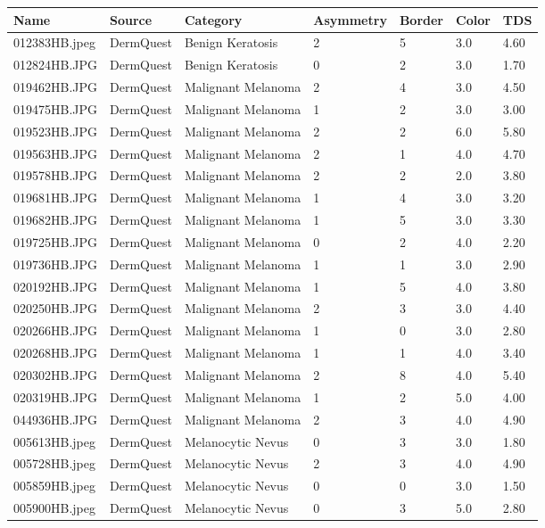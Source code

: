 \begin{longtable}{ | l | l | l | l | l | l | l |}
\hline
Name & Source & Category & Asymmetry & Border & Color & TDS \\ \hline
012383HB.jpeg & DermQuest & Benign Keratosis & 2 & 5 & 3.0 & 4.60 \\
012824HB.JPG & DermQuest & Benign Keratosis & 0 & 2 & 3.0 & 1.70 \\
019462HB.JPG & DermQuest & Malignant Melanoma & 2 & 4 & 3.0 & 4.50 \\
019475HB.JPG & DermQuest & Malignant Melanoma & 1 & 2 & 3.0 & 3.00 \\
019523HB.JPG & DermQuest & Malignant Melanoma & 2 & 2 & 6.0 & 5.80 \\
019563HB.JPG & DermQuest & Malignant Melanoma & 2 & 1 & 4.0 & 4.70 \\
019578HB.JPG & DermQuest & Malignant Melanoma & 2 & 2 & 2.0 & 3.80 \\
019681HB.JPG & DermQuest & Malignant Melanoma & 1 & 4 & 3.0 & 3.20 \\
019682HB.JPG & DermQuest & Malignant Melanoma & 1 & 5 & 3.0 & 3.30 \\
019725HB.JPG & DermQuest & Malignant Melanoma & 0 & 2 & 4.0 & 2.20 \\
019736HB.JPG & DermQuest & Malignant Melanoma & 1 & 1 & 3.0 & 2.90 \\
020192HB.JPG & DermQuest & Malignant Melanoma & 1 & 5 & 4.0 & 3.80 \\
020250HB.JPG & DermQuest & Malignant Melanoma & 2 & 3 & 3.0 & 4.40 \\
020266HB.JPG & DermQuest & Malignant Melanoma & 1 & 0 & 3.0 & 2.80 \\
020268HB.JPG & DermQuest & Malignant Melanoma & 1 & 1 & 4.0 & 3.40 \\
020302HB.JPG & DermQuest & Malignant Melanoma & 2 & 8 & 4.0 & 5.40 \\
020319HB.JPG & DermQuest & Malignant Melanoma & 1 & 2 & 5.0 & 4.00 \\
044936HB.JPG & DermQuest & Malignant Melanoma & 2 & 3 & 4.0 & 4.90 \\
005613HB.jpeg & DermQuest & Melanocytic Nevus & 0 & 3 & 3.0 & 1.80 \\
005728HB.jpeg & DermQuest & Melanocytic Nevus & 2 & 3 & 4.0 & 4.90 \\
005859HB.jpeg & DermQuest & Melanocytic Nevus & 0 & 0 & 3.0 & 1.50 \\
005900HB.jpeg & DermQuest & Melanocytic Nevus & 0 & 3 & 5.0 & 2.80 \\

\end{longtable}
